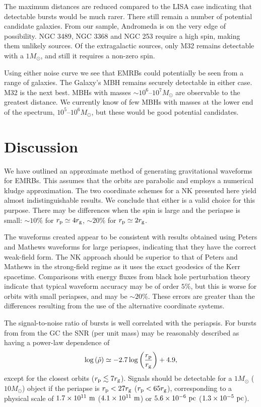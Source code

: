 The maximum distances are reduced compared to the LISA case indicating that detectable bursts would be much rarer. There still remain a number of potential candidate galaxies. From our sample, Andromeda is on the very edge of possibility. NGC 3489, NGC 3368 and NGC 253 require a high spin, making them unlikely sources. Of the extragalactic sources, only M32 remains detectable with a $1 M_\odot$, and still it requires a non-zero spin.

Using either noise curve we see that EMRBs could potentially be seen from a range of galaxies. The Galaxy's MBH remains securely detectable in either case. M32 is the next best. MBHs with masses $\sim 10^6$--$10^7 M_\odot$ are observable to the greatest distance. We currently know of few MBHs with masses at the lower end of the spectrum, $10^5$--$10^6 M_\odot$, but these would be good potential candidates.

\section{Discussion}\label{sec:End}

We have outlined an approximate method of generating gravitational waveforms for EMRBs. This assumes that the orbits are parabolic and employs a numerical kludge approximation. The two coordinate schemes for a NK presented here yield almost indistinguishable results. We conclude that either is a valid choice for this purpose. There may be differences when the spin is large and the periapse is small: $\sim 10\%$ for $r_\mathrm{p} \simeq 4 r_\mathrm{g}$, $\sim 20\%$ for $r_\mathrm{p} \simeq 2 r_\mathrm{g}$.

The waveforms created appear to be consistent with results obtained using Peters and Mathews waveforms for large periapses, indicating that they have the correct weak-field form. The NK approach should be superior to that of Peters and Mathews in the strong-field regime as it uses the exact geodesics of the Kerr spacetime. Comparisons with energy fluxes from black hole perturbation theory indicate that typical waveform accuracy may be of order $5\%$, but this is worse for orbits with small periapses, and may be $\sim 20\%$. These errors are greater than the differences resulting from the use of the alternative coordinate systems.

The signal-to-noise ratio of bursts is well correlated with the periapsis. For bursts from from the GC the SNR (per unit mass) may be reasonably described as having a power-law dependence of
\begin{equation}
\log\left(\hat{\rho}\right) \simeq -2.7\log\left(\frac{r_\mathrm{p}}{r_\mathrm{g}}\right) + 4.9,
\end{equation}
except for the closest orbits ($r_\mathrm{p} \lesssim 7 r_\mathrm{g}$). Signals should be detectable for a $1 M_\odot$ ($10 M_\odot$) object if the periapse is $r_\mathrm{p} < 27 r_\mathrm{g}$ ($r_\mathrm{p} < 65 r_\mathrm{g}$), corresponding to a physical scale of $1.7 \times 10^{11}~\mathrm{m}$ ($4.1 \times 10^{11}~\mathrm{m}$) or $5.6 \times 10^{-6}~\mathrm{pc}$ ($1.3 \times 10^{-5}~\mathrm{pc}$).

